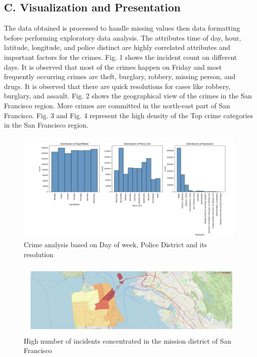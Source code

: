 \documentclass[10 pt,conference,final,]{IEEEtran}
\begin{document}
\subsection{C. Visualization and
Presentation}\label{c.-visualization-and-presentation}

The data obtained is processed to handle missing values then data
formatting before performing exploratory data analysis. The attributes
time of day, hour, latitude, longitude, and police distinct are highly
correlated attributes and important factors for the crimes. Fig. 1 shows
the incident count on different days. It is observed that most of the
crimes happen on Friday and most frequently occurring crimes are theft,
burglary, robbery, missing person, and drugs. It is observed that there
are quick resolutions for cases like robbery, burglary, and assault.
Fig. 2 shows the geographical view of the crimes in the San Francisco
region. More crimes are committed in the north-east part of San
Francisco. Fig. 3 and Fig. 4 represent the high density of the Top crime
categories in the San Francisco region.

\begin{figure}

{\centering \includegraphics[width=1\linewidth]{img/fig1} 

}

\caption{Crime analysis based on Day of week, Police District and its resolution}\label{fig:unnamed-chunk-1}
\end{figure}

\begin{figure}

{\centering \includegraphics[width=0.9\linewidth]{img/fig2} 

}

\caption{High number of incidents concentrated in the mission district of San Francisco}\label{fig:unnamed-chunk-2}
\end{figure}
\end{document}
